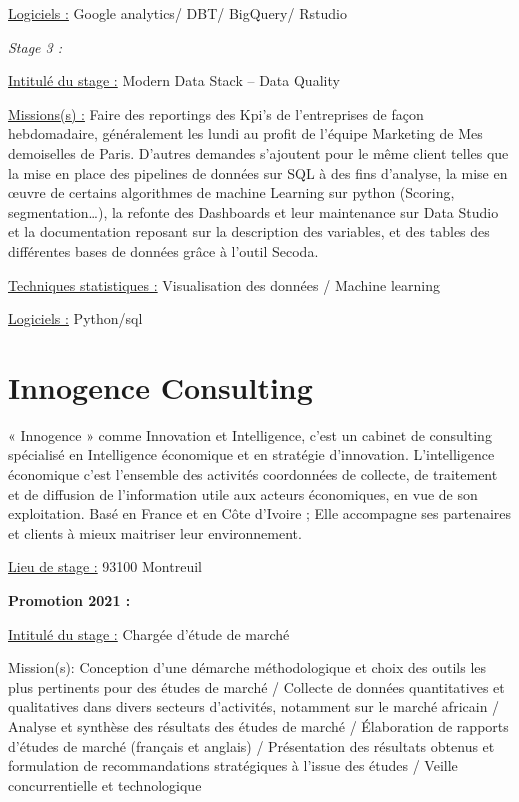 \documentclass[
  letterpaper,
  DIV=11,
  numbers=noendperiod]{scrreprt}
\begin{document}
\uline{Logiciels :} Google analytics/ DBT/ BigQuery/ Rstudio

\emph{Stage 3 :}

\uline{Intitulé du stage :} Modern Data Stack -- Data Quality

\uline{Missions(s) :} Faire des reportings des Kpi's de l'entreprises de
façon hebdomadaire, généralement les lundi au profit de l'équipe
Marketing de Mes demoiselles de Paris. D'autres demandes s'ajoutent pour
le même client telles que la mise en place des pipelines de données sur
SQL à des fins d'analyse, la mise en œuvre de certains algorithmes de
machine Learning sur python (Scoring, segmentation\ldots), la refonte
des Dashboards et leur maintenance sur Data Studio et la documentation
reposant sur la description des variables, et des tables des différentes
bases de données grâce à l'outil Secoda.

\uline{Techniques statistiques :} Visualisation des données / Machine
learning

\uline{Logiciels :} Python/sql

\hypertarget{innogence-consulting}{%
\section{\texorpdfstring{\textbf{Innogence
Consulting}}{Innogence Consulting}}\label{innogence-consulting}}

« Innogence » comme Innovation et Intelligence, c'est un cabinet de
consulting spécialisé en Intelligence économique et en stratégie
d'innovation. L'intelligence économique c'est l'ensemble des activités
coordonnées de collecte, de traitement et de diffusion de l'information
utile aux acteurs économiques, en vue de son exploitation. Basé en
France et en Côte d'Ivoire ; Elle accompagne ses partenaires et clients
à mieux maitriser leur environnement.

\uline{Lieu de stage :} 93100 Montreuil

\textbf{Promotion 2021 :}

\uline{Intitulé du stage :} Chargée d'étude de marché

Mission(s): Conception d'une démarche méthodologique et choix des outils
les plus pertinents pour des études de marché / Collecte de données
quantitatives et qualitatives dans divers secteurs d'activités,
notamment sur le marché africain / Analyse et synthèse des résultats des
études de marché / Élaboration de rapports d'études de marché (français
et anglais) / Présentation des résultats obtenus et formulation de
recommandations stratégiques à l'issue des études / Veille
concurrentielle et technologique
\end{document}
